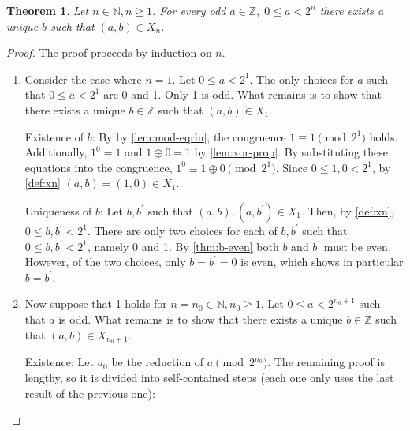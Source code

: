 \documentclass[1gpt]{article}
\theoremstyle{break}
\newtheorem{theorem}{Theorem}[section]
\newcommand{\xor}{\oplus}
\begin{document}
\begin{theorem}
    \label{thm:odd-a}
    Let $n \in \mathbb{N}, n \geq 1$. For every odd $a \in \mathbb{Z},\; 0 \leq
    a < 2^n$ there exists a unique $b$ such that $(a, b) \in X_n$.
\end{theorem}

\begin{proof}

    The proof proceeds by induction on $n$.

    \begin{enumerate}

        \item

            Consider the case where $n = 1$. Let $0 \leq a < 2^1$. The only
            choices for $a$ such that $0 \leq a < 2^1$ are 0 and 1. Only 1 is
            odd. What remains is to show that there exists a unique $b \in
            \mathbb{Z}$ such that $(a, b) \in X_1$.

            Existence of $b$: By by \ref{lem:mod-eqrln}, the congruence $1
            \equiv 1 \pmod{2^1}$ holds. Additionally, $1^0 = 1$ and $1 \xor 0 =
            1$ by \ref{lem:xor-prop}. By substituting these equations into the
            congruence, $1^0 \equiv 1 \xor 0 \pmod{2^1}$. Since $0 \leq 1, 0 <
            2^1$, by \ref{def:xn} $(a, b) = (1, 0) \in X_1$.

            Uniqueness of $b$: Let $b, b^\prime$ such that $(a, b), (a,
            b^\prime) \in X_1$. Then, by \ref{def:xn}, $0 \leq b, b^\prime <
            2^1$. There are only two choices for each of $b, b^\prime$ such
            that $0 \leq b, b^\prime < 2^1$, namely 0 and 1. By
            \ref{thm:b-even} both $b$ and $b^\prime$ must be even. However, of
            the two choices, only $b = b^\prime = 0$ is even, which shows in
            particular $b = b^\prime$.

        \item

            Now suppose that \ref{thm:odd-a} holds for $n = n_0 \in \mathbb{N},
            n_0 \geq 1$. Let $0 \leq a < 2^{n_0+1}$ such that $a$ is odd. What
            remains is to show that there exists a unique $b \in \mathbb{Z}$
            such that $(a, b) \in X_{n_0+1}$.

            Existence: Let $a_0$ be the reduction of $a \pmod{2^{n_0}}$. The
            remaining proof is lengthy, so it is divided into self-contained
            steps (each one only uses the last result of the previous one):


\end{enumerate}
\end{proof}
\end{document}

